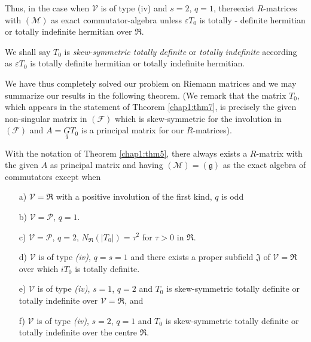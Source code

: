 Thus, in the case when $\mathscr{V}$ is of type (iv) and $s=2$, $q=1$,
there\pageoriginale exist $R$-matrices with $(\mathscr{M})$ as exact
commutator-algebra unless $\varepsilon T_{0}$ is totally - definite
hermitian or totally indefinite hermitian over $\mathfrak{R}$.

We shall say $T_{0}$ is {\em skew-symmetric totally definite} or {\em
  totally indefinite} according as $\varepsilon T_{0}$ is totally
definite hermitian or totally indefinite hermitian.

We have thus completely solved our problem on Riemann matrices and we
may summarize our results in the following theorem. (We remark that
the matrix $T_{0}$, which appears in the statement of Theorem
\ref{chap1:thm7}, is precisely the given non-singular matrix in
$(\mathscr{F})$ which is skew-symmetric for the involution in
$(\mathscr{F})$ and $A=\underset{q}{G}T_{0}$ is a principal matrix for
our $R$-matrices).

\begin{thm}\label{chap1:thm7}
With the notation of Theorem \ref{chap1:thm5}, there always exists a
$R$-matrix with the given $A$ as principal matrix and having
$(\mathscr{M})=(\mathfrak{g})$ as the exact algebra of commutators
except when
\begin{itemize}
\item[\rm a)] $\mathscr{V}=\mathfrak{R}$ with a positive involution of
  the first kind, $q$ is odd

\item[\rm b)] $\mathscr{V}=\mathscr{P}$, $q=1$.

\item[\rm c)] $\mathscr{V}=\mathscr{P}$, $q=2$,
  $N_{\mathfrak{R}}(|T_{0}|)=\tau^{2}$ for $\tau> 0$ in
  $\mathfrak{R}$.

\item[\rm d)] $\mathscr{V}$ is of type {\em (iv)}, $q=s=1$ and there exists a
  proper subfield $\mathfrak{J}$ of $\mathscr{V}=\mathfrak{R}$ over
  which $iT_{0}$ is totally definite.

\item[\rm e)] $\mathscr{V}$ is of type {\em (iv)}, $s=1$, $q=2$ and
  $T_{0}$ is skew-symmetric totally definite or totally indefinite
  over $\mathscr{V}=\mathfrak{R}$, and

\item[\rm f)] $\mathscr{V}$ is of type {\em (iv)}, $s=2$, $q=1$ and
  $T_{0}$ is skew-symmetric totally definite or totally indefinite
  over the centre $\mathfrak{R}$.   
\end{itemize}
\end{thm}

